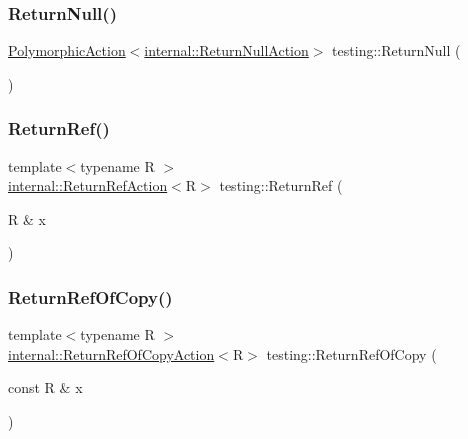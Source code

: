\mbox{\label{namespacetesting_aa0331596e269114da101f810d3a1b88b}} 
\subsubsection{\texorpdfstring{ReturnNull()}{ReturnNull()}}
{\footnotesize\ttfamily \mbox{\hyperlink{classtesting_1_1PolymorphicAction}{Polymorphic\+Action}}$<$\mbox{\hyperlink{classtesting_1_1internal_1_1ReturnNullAction}{internal\+::\+Return\+Null\+Action}}$>$ testing\+::\+Return\+Null (\begin{DoxyParamCaption}{ }\end{DoxyParamCaption})\hspace{0.3cm}{\ttfamily [inline]}}

\mbox{\label{namespacetesting_a18eda8fe9c89ee856c199a2e04ca1641}} 
\subsubsection{\texorpdfstring{ReturnRef()}{ReturnRef()}}
{\footnotesize\ttfamily template$<$typename R $>$ \\
\mbox{\hyperlink{classtesting_1_1internal_1_1ReturnRefAction}{internal\+::\+Return\+Ref\+Action}}$<$R$>$ testing\+::\+Return\+Ref (\begin{DoxyParamCaption}\item[{R \&}]{x }\end{DoxyParamCaption})\hspace{0.3cm}{\ttfamily [inline]}}

\mbox{\label{namespacetesting_ac1b75444c89371dc25ebcfcc48336201}} 
\subsubsection{\texorpdfstring{ReturnRefOfCopy()}{ReturnRefOfCopy()}}
{\footnotesize\ttfamily template$<$typename R $>$ \\
\mbox{\hyperlink{classtesting_1_1internal_1_1ReturnRefOfCopyAction}{internal\+::\+Return\+Ref\+Of\+Copy\+Action}}$<$R$>$ testing\+::\+Return\+Ref\+Of\+Copy (\begin{DoxyParamCaption}\item[{const R \&}]{x }\end{DoxyParamCaption})\hspace{0.3cm}{\ttfamily [inline]}}

